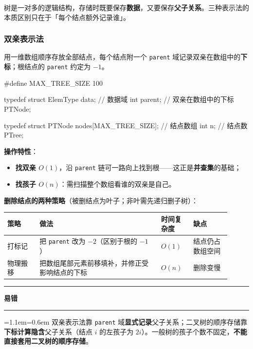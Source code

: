 \documentclass[11pt,openany,UTF8]{ctexbook}
\newcommand{\callouthead}[2]{%
  \par\addvspace{7pt}\noindent
  {\color{#1}\rule[-0.15em]{3pt}{1.05em}}\hspace{0.5em}%
  {\bfseries\color{#1}#2}\par\nobreak\vspace{-0.35em}%
  {\color{rulesep}\hrule height 0.4pt}\nobreak\vspace{0.45em}%
  \begingroup\small\setlength{\parindent}{0pt}%
  \leftskip=1.1em\rightskip=0.6em\noindent\ignorespaces}
\newcommand{\calloutend}{\par\endgroup\addvspace{7pt}}
\newenvironment{callwarn}[1]{\callouthead{warnbar}{#1}}{\calloutend}
\begin{document}
树是一对多的逻辑结构，存储时既要保存\textbf{数据}，又要保存\textbf{父子关系}。三种表示法的本质区别只在于「每个结点额外记录谁」。

\subsubsection{双亲表示法}

用一维数组顺序存放全部结点，每个结点附一个 \texttt{parent} 域记录双亲在数组中的\textbf{下标}；根结点的 \texttt{parent} 约定为 $-1$。

\begin{codebox}
#define MAX_TREE_SIZE 100

typedef struct {
    ElemType data;                  // 数据域
    int parent;                     // 双亲在数组中的下标
} PTNode;

typedef struct {
    PTNode nodes[MAX_TREE_SIZE];    // 结点数组
    int n;                          // 结点数
} PTree;
\end{codebox}

\textbf{操作特性}：

\begin{itemize}
\item \textbf{找双亲 $O(1)$}，沿 \texttt{parent} 链可一路向上找到根——这正是\textbf{并查集}的基础；
\item \textbf{找孩子 $O(n)$}：需扫描整个数组看谁的双亲是自己。
\end{itemize}
\textbf{删除结点的两种策略}（被删结点为叶子；非叶需先递归删子树）：

\begingroup\small\setlength{\tabcolsep}{4.0pt}
\begin{longtable}{@{}L{0.1318\linewidth}L{0.4941\linewidth}L{0.1318\linewidth}L{0.1537\linewidth}@{}}
\toprule
\textbf{策略} & \textbf{做法} & \textbf{时间复杂度} & \textbf{缺点} \\
\midrule
\endhead
打标记 & 把 \texttt{parent} 改为 $-2$（区别于根的 $-1$） & $O(1)$ & 结点仍占数组空间 \\
物理搬移 & 把数组尾部元素前移填补，并修正受影响结点的下标 & $O(n)$ & 删除变慢 \\
\bottomrule
\end{longtable}
\endgroup

\begin{callwarn}{易错}
双亲表示法靠 \texttt{parent} 域\textbf{显式记录}父子关系；二叉树的顺序存储靠\textbf{下标计算隐含}父子关系（结点 $i$ 的左孩子为 $2i$）。一般树的孩子个数不固定，\textbf{不能直接套用二叉树的顺序存储}。

\end{callwarn}
\end{document}
